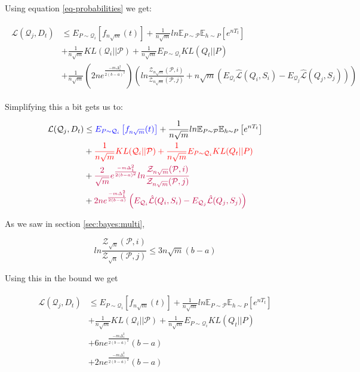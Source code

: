 \documentclass[letterpaper]{article}
\theoremstyle{definition}
\begin{document}
Using equation \ref{eq-probabilities} we get:

\begin{align*} 
\begin{split}
\mathcal{L}(\mathcal{Q}_j, D_t)& \leq  E_{P\sim \mathcal{Q}_i} \left [ f_{n\sqrt{m}}(t)\right ] + \frac{1}{n\sqrt{m}} ln\mathbb{E}_{P\sim \mathcal{P}}\mathbb{E}_{h\sim P}\left [ e^{nT_t} \right ]\\
& +\frac{1}{n\sqrt{m}} KL(\mathcal{Q}_i||\mathcal{P}) +\frac{1}{n\sqrt{m}}E_{P\sim \mathcal{Q}_i} KL(Q_t||P) \\ & + \frac{1}{n\sqrt{m}}\left (2ne^{\frac{-m\Delta_1^2}{2(b-a)^2}}\right )\left ( ln\frac{\mathcal{Z}_{n\sqrt{m}}(\mathcal{P}, i)}{\mathcal{Z}_{n\sqrt{m}}(\mathcal{P}, j)} 
	+n\sqrt{m} \left (E_{\mathcal{Q}_i} \hat{\mathcal{L}}(Q_i,S_i)
	-E_{\mathcal{Q}_j} \hat{\mathcal{L}}(Q_j,S_j)\right ) \right )  
\end{split}
\end{align*}

Simplifying this a bit gets us to:

\begin{align} \label{eq-new-bound-prob}
\begin{split}
\mathcal{L}(\mathcal{Q}_j, D_t)& \leq  \textcolor{blue}{E_{P\sim \mathcal{Q}_i} \left [ f_{n\sqrt{m}}(t)\right ]} + \frac{1}{n\sqrt{m}} ln\mathbb{E}_{P\sim \mathcal{P}}\mathbb{E}_{h\sim P}\left [ e^{nT_t} \right ]\\
& +\textcolor{red}{\frac{1}{n\sqrt{m}} KL(\mathcal{Q}_i||\mathcal{P}) +\frac{1}{n\sqrt{m}}E_{P\sim \mathcal{Q}_i} KL(Q_t||P)} \\ & + \textcolor{purple}{\frac{2}{\sqrt{m}}e^{\frac{-m\Delta_1^2}{2(b-a)^2}} ln\frac{\mathcal{Z}_{n\sqrt{m}}(\mathcal{P}, i)}{\mathcal{Z}_{n\sqrt{m}}(\mathcal{P}, j)} }
\\ &+ \textcolor{purple}{2ne^{\frac{-m\Delta_1^2}{2(b-a)}} \left (E_{\mathcal{Q}_i} \hat{\mathcal{L}}(Q_i,S_i)
-E_{\mathcal{Q}_j} \hat{\mathcal{L}}(Q_j,S_j)\right ) }
\end{split}
\end{align}

As we saw in section \ref{sec:bayes:multi}, 

$$ln\frac{\mathcal{Z}_{\sqrt{n}}(\mathcal{P}, i)}{\mathcal{Z}_{\sqrt{n}}(\mathcal{P}, j)} \leq 3n\sqrt{m}(b-a)$$

Using this in the bound we get 

\begin{align*} 
\begin{split}
\mathcal{L}(\mathcal{Q}_j, D_t)& \leq  E_{P\sim \mathcal{Q}_i} \left [ f_{n\sqrt{m}}(t)\right ] + \frac{1}{n\sqrt{m}} ln\mathbb{E}_{P\sim \mathcal{P}}\mathbb{E}_{h\sim P}\left [ e^{nT_t} \right ]\\
& +\frac{1}{n\sqrt{m}} KL(\mathcal{Q}_i||\mathcal{P}) +\frac{1}{n\sqrt{m}}E_{P\sim \mathcal{Q}_i} KL(Q_t||P) \\ & + 6ne^{\frac{-m\Delta_1^2}{2(b-a)^2}} (b-a) 
\\ &+ 2ne^{\frac{-m\Delta_1^2}{2(b-a)^2}} (b-a)
\end{split}
\end{align*}
\end{document}
